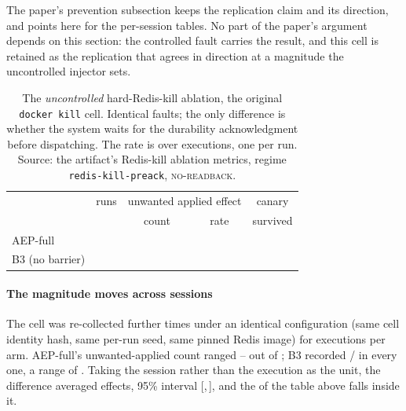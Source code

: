 \documentclass[10pt,journal,compsoc]{IEEEtran}
\begin{document}
The paper's prevention subsection keeps the replication claim and its direction,
and points here for the per-session tables. No part of the paper's argument
depends on this section: the controlled fault carries the result, and
this cell is retained as the replication that agrees in direction at a magnitude
the uncontrolled injector sets.

\begin{table}[h]
\centering
\caption{The \emph{uncontrolled} hard-Redis-kill ablation, the original
\texttt{docker kill} cell. Identical faults; the only difference is whether the
system waits for the durability acknowledgment before dispatching. The rate is
over executions, one per run. Source: the artifact's Redis-kill ablation
metrics, regime \texttt{redis-kill-preack}, \textsc{no-readback}.}
\label{supptab:killablation}
\small
\begin{tabular}{@{}lcccc@{}}
\toprule
 & runs & \multicolumn{2}{c}{unwanted applied effect} & canary \\
 & & count & rate & survived \\
\midrule
AEP-full & \AepKillRuns{} & \AepKillApplied{} & \AepUnwantedRate{} & \AepKillCanary{} \\
B3 (no barrier) & \BthreeKillRuns{} & \BthreeKillApplied{} & \BthreeUnwantedRate{} & \BthreeKillCanary{} \\
\bottomrule
\end{tabular}
\end{table}

\paragraph{The magnitude moves across sessions} The cell was re-collected
\ReplicationSessions{} further times under an identical configuration (same
cell identity hash, same per-run seed, same pinned Redis image) for
\ReplicationRuns{} executions per arm. AEP-full's unwanted-applied count ranged
\ReplicationAepMin{}--\ReplicationAepMax{} out of \AepKillRuns{}; B3 recorded
\ReplicationBthreeApplied{}/\AepKillRuns{} in every one, a range of
\ReplicationBthreeRange{}. Taking the session rather than the execution as the
unit, the difference averaged \ReplicationPreventedMean{} effects, 95\% interval
[\ReplicationPreventedLow{},\,\ReplicationPreventedHigh{}], and the
\UnwantedPrevented{} of the table above falls inside it.
\end{document}
